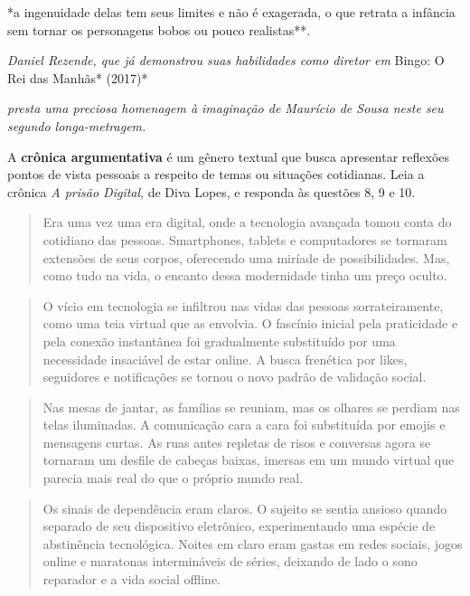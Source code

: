 *a ingenuidade delas tem seus limites e não é exagerada, o que retrata a
infância sem tornar os personagens bobos ou pouco realistas**.

\emph{Daniel Rezende, que já demonstrou suas habilidades como diretor em
}Bingo: O Rei das Manhãs* (2017)*

\emph{presta uma preciosa homenagem à imaginação de Maurício de Sousa
neste seu segundo longa-metragem.}

A \textbf{crônica argumentativa} é um gênero textual que busca
apresentar reflexões pontos de vista pessoais a respeito de temas ou
situações cotidianas. Leia a crônica \emph{A prisão Digital}, de Diva
Lopes, e responda às questões 8, 9 e 10.

\begin{quote}
Era uma vez uma era digital, onde a tecnologia avançada tomou conta do
cotidiano das pessoas. Smartphones, tablets e computadores se tornaram
extensões de seus corpos, oferecendo uma miríade de possibilidades. Mas,
como tudo na vida, o encanto dessa modernidade tinha um preço oculto.
\end{quote}

\begin{quote}
O vício em tecnologia se infiltrou nas vidas das pessoas
sorrateiramente, como uma teia virtual que as envolvia. O fascínio
inicial pela praticidade e pela conexão instantânea foi gradualmente
substituído por uma necessidade insaciável de estar online. A busca
frenética por likes, seguidores e notificações se tornou o novo padrão
de validação social.
\end{quote}

\begin{quote}
Nas mesas de jantar, as famílias se reuniam, mas os olhares se perdiam
nas telas iluminadas. A comunicação cara a cara foi substituída por
emojis e mensagens curtas. As ruas antes repletas de risos e conversas
agora se tornaram um desfile de cabeças baixas, imersas em um mundo
virtual que parecia mais real do que o próprio mundo real.
\end{quote}

\begin{quote}
Os sinais de dependência eram claros. O sujeito se sentia ansioso quando
separado de seu dispositivo eletrônico, experimentando uma espécie de
abstinência tecnológica. Noites em claro eram gastas em redes sociais,
jogos online e maratonas intermináveis de séries, deixando de lado o
sono reparador e a vida social offline.
\end{quote}

